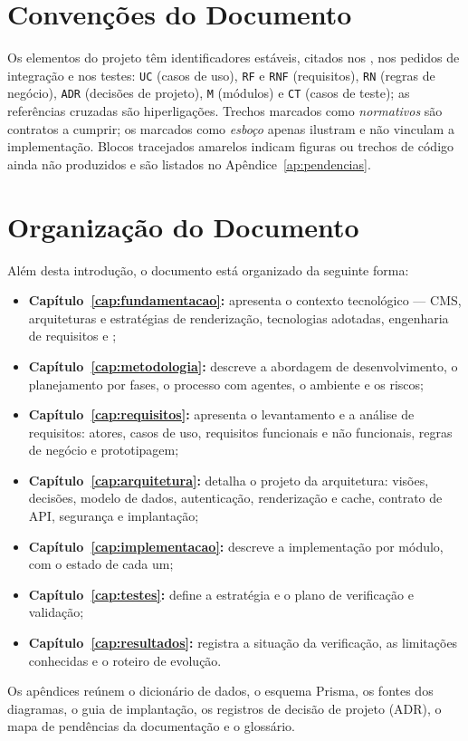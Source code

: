 \section{Convenções do Documento}\label{sec:convencoes}

Os elementos do projeto têm identificadores estáveis, citados nos , nos pedidos de integração e nos testes: \texttt{UC} (casos de uso), \texttt{RF} e \texttt{RNF} (requisitos), \texttt{RN} (regras de negócio), \texttt{ADR} (decisões de projeto), \texttt{M} (módulos) e \texttt{CT} (casos de teste); as referências cruzadas são hiperligações. Trechos marcados como \emph{normativos} são contratos a cumprir; os marcados como \emph{esboço} apenas ilustram e não vinculam a implementação. Blocos tracejados amarelos indicam figuras ou trechos de código ainda não produzidos e são listados no Apêndice~\ref{ap:pendencias}.

\section{Organização do Documento}\label{sec:organizacao}

Além desta introdução, o documento está organizado da seguinte forma:

\begin{itemize}
  \item \textbf{Capítulo~\ref{cap:fundamentacao}:} apresenta o contexto tecnológico --- CMS, arquiteturas e estratégias de renderização, tecnologias adotadas, engenharia de requisitos e ;
  \item \textbf{Capítulo~\ref{cap:metodologia}:} descreve a abordagem de desenvolvimento, o planejamento por fases, o processo com agentes, o ambiente e os riscos;
  \item \textbf{Capítulo~\ref{cap:requisitos}:} apresenta o levantamento e a análise de requisitos: atores, casos de uso, requisitos funcionais e não funcionais, regras de negócio e prototipagem;
  \item \textbf{Capítulo~\ref{cap:arquitetura}:} detalha o projeto da arquitetura: visões, decisões, modelo de dados, autenticação, renderização e cache, contrato de API, segurança e implantação;
  \item \textbf{Capítulo~\ref{cap:implementacao}:} descreve a implementação por módulo, com o estado de cada um;
  \item \textbf{Capítulo~\ref{cap:testes}:} define a estratégia e o plano de verificação e validação;
  \item \textbf{Capítulo~\ref{cap:resultados}:} registra a situação da verificação, as limitações conhecidas e o roteiro de evolução.
\end{itemize}

Os apêndices reúnem o dicionário de dados, o esquema Prisma, os fontes dos diagramas, o guia de implantação, os registros de decisão de projeto (ADR), o mapa de pendências da documentação e o glossário.
